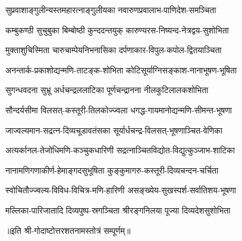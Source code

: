 \twolineshloka
{सुप्रवाशाङ्गुलीन्यस्तमहारत्नाङ्गुलीयका}
{नवारुणप्रवालाभ-पाणिदेश-समञ्चिता}%

\twolineshloka
{कम्बुकण्ठी  सुचुबुका  बिम्बोष्ठी  कुन्ददन्तयुक्}
{कारुण्यरस-निष्यन्द-नेत्रद्वय-सुशोभिता}%


\twolineshloka
{मुक्ताशुचिस्मिता  चारुचाम्पेयनिभनासिका}
{दर्पणाकार-विपुल-कपोल-द्वितयाञ्चिता}%


\twolineshloka
{अनन्तार्क-प्रकाशोद्यन्मणि-ताटङ्क-शोभिता}
{कोटिसूर्याग्निसङ्काश-नानाभूषण-भूषिता}%


\twolineshloka
{सुगन्धवदना  सुभ्रू  अर्धचन्द्रललाटिका}
{पूर्णचन्द्रानना  नीलकुटिलालकशोभिता}%


\twolineshloka
{सौन्दर्यसीमा  विलसत्-कस्तूरी-तिलकोज्ज्वला}
{धगद्ध-गायमानोद्यन्मणि-सीमन्त-भूषणा}%


\twolineshloka
{जाज्वल्यमान-सद्रत्न-दिव्यचूडावतंसका}
{सूर्यार्धचन्द्र-विलसत्-भूषणाञ्चित-वेणिका}%


\twolineshloka
{अत्यर्कानल-तेजोधिमणि-कञ्चुकधारिणी}
{सद्रत्नाञ्चितविद्योत-विद्युत्कुञ्जाभ-शाटिका}%

\twolineshloka
{नानामणिगणाकीर्ण-हेमाङ्गदसुभूषिता}
{कुङ्कुमागरु-कस्तूरी-दिव्यचन्दन-चर्चिता}%

\twolineshloka
{स्वोचितौज्ज्वल्य-विविध-विचित्र-मणि-हारिणी}
{असङ्ख्येय-सुखस्पर्श-सर्वातिशय-भूषणा}%

\twolineshloka
{मल्लिका-पारिजातादि  दिव्यपुष्प-स्रगञ्चिता}
{श्रीरङ्गनिलया  पूज्या  दिव्यदेशसुशोभिता}%

{॥इति श्री-गोदाष्टोत्तरशतनामस्तोत्रं सम्पूर्णम्॥}